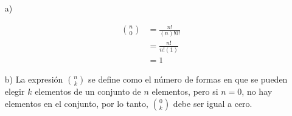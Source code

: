 \begin{itemize}
    \item [a) ]

    \begin{equation*}
        \begin{split}
            \binom{n}{0} & = \frac{n!}{(n)! 0!} \\
            & = \frac{n!}{n!(1)} \\
            & = 1
        \end{split}
    \end{equation*}

    \item [b) ] La expresión $\binom{n}{k}$ se define como el número de formas en que se pueden elegir $k$ elementos de un conjunto de $n$ elementos, pero si $n=0$, no hay elementos en el conjunto, por lo tanto, $\binom{0}{k}$ debe ser igual a cero.
\end{itemize}

